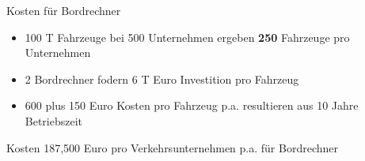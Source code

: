
\begin{frame}{Kosten für Bordrechner}
  \begin{itemize}
  \item 100 T Fahrzeuge bei 500 Unternehmen ergeben \textbf{250} Fahrzeuge pro Unternehmen
  \item 2 Bordrechner fodern 6 T Euro Investition pro Fahrzeug
  \item 600 plus 150 Euro Kosten pro Fahrzeug p.a. resultieren aus 10 Jahre Betriebszeit
  \end{itemize}
  \begin{block}{Kosten}
    187,500 Euro pro Verkehrsunternehmen p.a. für Bordrechner
  \end{block}
\end{frame}
